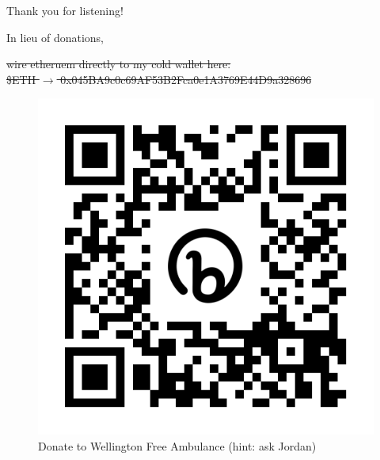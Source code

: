 \documentclass{beamer}
\begin{document}
\begin{frame}{Thank you for listening!}
\vspace{0.2cm}

In lieu of donations,

\sout{
    wire etheruem directly to my cold wallet here: 
    \\ 
    \$ETH $\to$ 0x045BA9c0c69AF53B2Fca0e1A3769E44D9a328696
}

\vspace{1cm}

\begin{figure}
    \centering
    \includegraphics[height=0.3\textheight]{assets/qr/wellington_free_qr.png}
    \caption{Donate to Wellington Free Ambulance (hint: ask Jordan)}
    \label{fig:qr-code}
\end{figure}
\end{frame}
\end{document}
